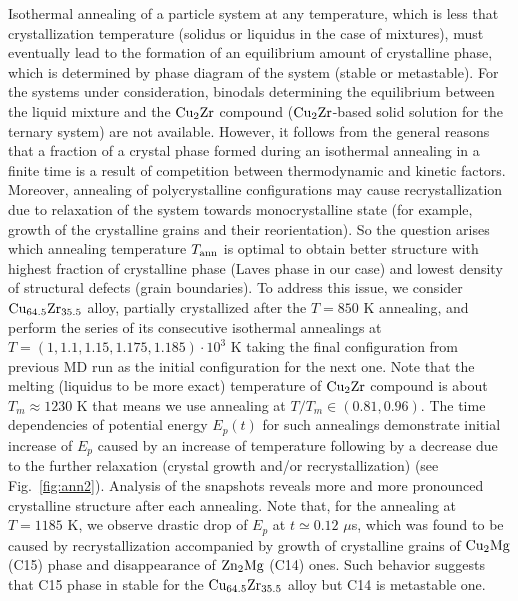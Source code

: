 \documentclass[jcp,twocolumn,superscriptaddress,floatfix,graphicx,showpacs]{revtex4-1}
\begin{document}
 Isothermal annealing of a particle system at any temperature, which is less that crystallization temperature (solidus or liquidus in the case of mixtures), must eventually lead to the formation of an equilibrium amount of crystalline phase, which is determined by phase diagram of the system (stable or metastable). For the systems under consideration, binodals determining the equilibrium between the liquid mixture and the ${\rm Cu_2Zr}$ compound (${\rm Cu_2Zr}$-based solid solution for the ternary system) are not available. However, it follows from the general reasons that a fraction of a crystal phase formed during an isothermal annealing in a finite time is a result of competition between thermodynamic and kinetic factors. Moreover, annealing of polycrystalline configurations may cause recrystallization due to relaxation of the system towards monocrystalline state (for example, growth of the crystalline grains and their reorientation).  So the question arises which annealing temperature $T_{\rm ann}$ is optimal to obtain better structure with highest fraction of crystalline phase (Laves phase in our case) and lowest density of structural defects (grain boundaries). To address this issue, we consider ${\rm Cu_{64.5}Zr_{35.5}}$ alloy, partially crystallized after the $T=850$ K annealing, and perform the series of its consecutive isothermal annealings at $T= (1, 1.1, 1.15, 1.175, 1.185)\cdot 10^3$ K taking the final configuration from previous MD run as the initial configuration for the next one. Note that the melting (liquidus to be more exact) temperature of ${\rm Cu_2 Zr}$ compound is about $T_m\approx 1230$ K that means we use annealing at $T/T_m \in (0.81, 0.96)$.  The time dependencies of potential energy $E_p(t)$ for such annealings demonstrate initial increase of $E_p$ caused by an increase of temperature following by a decrease due to the further relaxation (crystal growth and/or recrystallization) (see Fig.~\ref{fig:ann2}). Analysis of the snapshots reveals more and more pronounced crystalline structure after each annealing. Note that, for the annealing at $T=1185$ K, we observe drastic drop of  $E_p$ at $t\simeq 0.12$ $\mu$s, which was found to be caused by recrystallization accompanied by growth of crystalline grains of ${\rm Cu_2Mg}$ (C15) phase and disappearance of ${\rm Zn_2Mg}$ (C14) ones. Such behavior suggests that C15 phase in stable for the ${\rm Cu_{64.5}Zr_{35.5}}$ alloy but C14 is metastable one.
\end{document}
